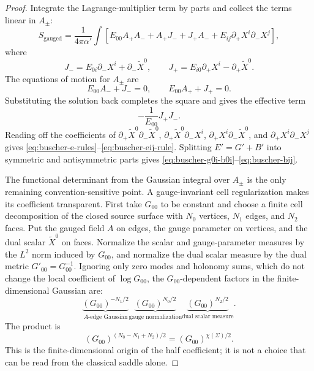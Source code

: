 \begin{proof}
Integrate the Lagrange-multiplier term by parts and collect the terms
linear in \(A_\pm\):
\[
  S_{\mathrm{gauged}}
  =
  \frac1{4\pi\alpha'}
  \int
  \left[
    E_{00}A_+A_-
    +A_+J_-
    +J_+A_-
    +E_{ij}\partial_+X^i\partial_-X^j
  \right],
\]
where
\[
  J_-=E_{0i}\partial_-X^i+\partial_-\widetilde X^0,
  \qquad
  J_+=E_{i0}\partial_+X^i-\partial_+\widetilde X^0 .
\]
The equations of motion for \(A_\pm\) are
\[
  E_{00}A_-+J_-=0,
  \qquad
  E_{00}A_++J_+=0 .
\]
Substituting the solution back completes the square and gives the effective
term
\[
  -\frac1{E_{00}}J_+J_- .
\]
Reading off the coefficients of
\(\partial_+\widetilde X^0\partial_-\widetilde X^0\),
\(\partial_+\widetilde X^0\partial_-X^i\),
\(\partial_+X^i\partial_-\widetilde X^0\), and
\(\partial_+X^i\partial_-X^j\) gives
\eqref{eq:buscher-e-rules}--\eqref{eq:buscher-eij-rule}.  Splitting
\(E'=G'+B'\) into symmetric and antisymmetric parts gives
\eqref{eq:buscher-g0i-b0i}--\eqref{eq:buscher-bij}.

The functional determinant from the Gaussian integral over \(A_\pm\) is
the only remaining convention-sensitive point.  A gauge-invariant cell
regularization makes its coefficient transparent.  First take \(G_{00}\) to
be constant and choose a finite cell decomposition of the closed source surface
with \(N_0\) vertices, \(N_1\) edges, and \(N_2\) faces.  Put the gauged
field \(A\) on edges, the gauge parameter on vertices, and the dual scalar
\(\widetilde X^0\) on faces.  Normalize the scalar and gauge-parameter
measures by the \(L^2\) norm induced by \(G_{00}\), and normalize the dual
scalar measure by the dual metric \(G'_{00}=G_{00}^{-1}\).  Ignoring only
zero modes and holonomy sums, which do not change the local coefficient of
\(\log G_{00}\), the \(G_{00}\)-dependent factors in the finite-dimensional
Gaussian are:
\[
  \underbrace{(G_{00})^{-N_1/2}}_{A\text{-edge Gaussian}}
  \underbrace{(G_{00})^{N_0/2}}_{\text{gauge normalization}}
  \underbrace{(G_{00})^{N_2/2}}_{\text{dual scalar measure}} .
\]
The product is
\begin{equation}
  (G_{00})^{(N_0-N_1+N_2)/2}
  =
  (G_{00})^{\chi(\Sigma)/2}.
  \label{eq:buscher-cell-determinant-euler-factor}
\end{equation}
This is the finite-dimensional origin of the half coefficient; it is not a
choice that can be read from the classical saddle alone.


\end{proof}
